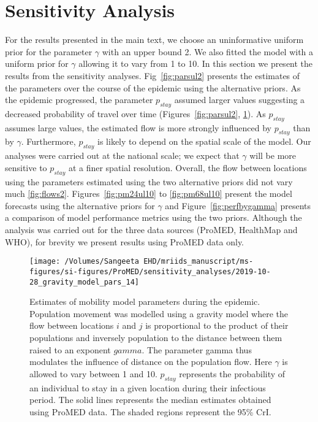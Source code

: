 \documentclass[9pt,twoside,lineno]{pnas-new}
\begin{document}
\section{Sensitivity Analysis}\label{sec:sensitivity-analysis}

For the results presented in the main text, we choose an uninformative
uniform prior for the parameter \(\gamma\) with an upper bound 2. We
also fitted the model with a uniform prior for \(\gamma\) allowing it to
vary from 1 to 10. In this section we present the results from the
sensitivity analyses. Fig~\ref{fig:parsul2} presents the
estimates of the parameters over the course of the epidemic using the
alternative priors. As the epidemic progressed, 
the parameter $p_{stay}$ assumed larger values suggesting a decreased
probability of travel over time (Figures~\ref{fig:parsul2},
\ref{fig:parsul10}). As $p_{stay}$ assumes large values,
the estimated flow is more strongly influenced by $p_{stay}$ than by
$\gamma$. Furthermore, $p_{stay}$ is likely to depend on the spatial
scale of the model. Our analyses were carried out at the
national scale; we expect that $\gamma$ will be more sensitive to
$p_{stay}$ at a finer spatial resolution. Overall, the  flow
between locations using the parameters estimated using the two
alternative priors did not vary much
\ref{fig:flows2}. Figures~\ref{fig:pm24ul10} to \ref{fig:pm68ul10}
present the model forecasts using the alternative priors for $\gamma$
and Figure~\ref{fig:perfbygamma} presents a comparison of model
performance metrics using the two priors.
Although the analysis was carried out for the
three data sources (ProMED, HealthMap and WHO), for brevity we present
results using ProMED data only.


\begin{figure}
  \centering 
   \texttt{[image: /Volumes/Sangeeta EHD/mriids\_manuscript/ms-figures/si-figures/ProMED/sensitivity\_analyses/2019-10-28\_gravity\_model\_pars\_14]}
  \caption{Estimates of mobility model
  parameters during the epidemic. Population movement was modelled using a
  gravity model where the flow between locations \(i\) and \(j\) is
  proportional to the product of their populations and inversely
  population to the distance between them raised to an exponent \(gamma\).
  The parameter gamma thus modulates the influence of distance on the
  population flow. Here \(\gamma\) is allowed to vary between 1 and 10.
  \(p_{stay}\) represents the probability of an individual to stay in a
  given location during their infectious period. The solid lines
  represents the median estimates obtained using ProMED data. The shaded
  regions represent the 95\% CrI.}
\label{fig:parsul10}
\end{figure}\FloatBarrier
\end{document}
